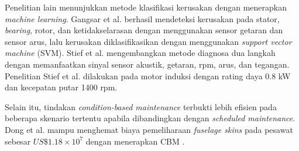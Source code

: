 \documentclass{elsinta}
\begin{document}
Penelitian lain menunjukkan metode klasifikasi kerusakan dengan menerapkan
\textit{machine learning}. Gangsar et al.\cite{Gangsar2018,Yaman2021} berhasil mendeteksi kerusakan
pada stator, \textit{bearing}, rotor, dan ketidakselarasan dengan menggunakan
sensor getaran dan sensor arus, lalu kerusakan diklasifikasikan dengan
menggunakan \textit{support vector machine} (SVM). Stief et al. \cite{Stief2017,Yaman2021} mengembangkan metode diagnosa dua langkah
dengan memanfaatkan sinyal sensor akustik, getaran, rpm, arus, dan tegangan.
Penelitian Stief et al. dilakukan pada motor induksi dengan rating daya 0.8 kW dan kecepatan
putar 1400 rpm. %

Selain itu, tindakan \textit{condition-based maintenance} terbukti
lebih efisien pada beberapa skenario tertentu apabila dibandingkan dengan \textit{scheduled maintenance}.
Dong et al. mampu menghemat biaya pemeliharaan \textit{fuselage skins}
pada pesawat sebesar $US\mathdollar1.18 \times 10^{7}$ dengan menerapkan
CBM \cite{Dong2019}. %
\end{document}
